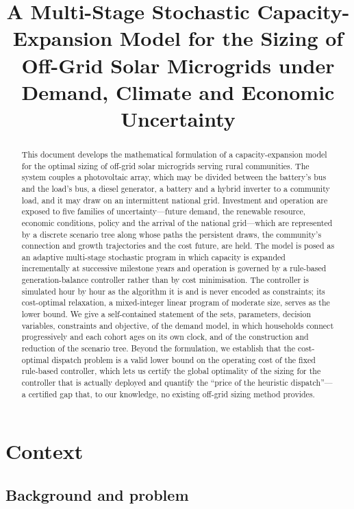 \documentclass[11pt,a4paper]{article}
\title{A Multi-Stage Stochastic Capacity-Expansion Model for the Sizing of
Off-Grid Solar Microgrids under Demand, Climate and Economic Uncertainty}
\author{}
\date{}
\theoremstyle{plain}
\theoremstyle{definition}
\begin{document}
\maketitle

\begin{abstract}
This document develops the mathematical formulation of a capacity-expansion model
for the optimal sizing of off-grid solar microgrids serving rural communities. The
system couples a photovoltaic array, which may be divided between the battery's bus and
the load's bus, a diesel generator, a battery and a hybrid inverter to a community load,
and it may draw on an intermittent national grid. Investment and operation are exposed to
five families of uncertainty---future demand, the renewable resource, economic
conditions, policy and the arrival of the national grid---which are represented by a
discrete scenario tree along whose paths the persistent draws, the community's connection
and growth trajectories and the cost future, are held. The model is posed as an adaptive
multi-stage stochastic program in which capacity is expanded incrementally at successive
milestone years and operation is governed by a rule-based generation-balance controller
rather than by cost minimisation. The controller is simulated hour by hour as the
algorithm it is and is never encoded as constraints; its cost-optimal relaxation, a
mixed-integer linear program of moderate size, serves as the lower bound. We give a
self-contained statement of the sets, parameters, decision variables, constraints and
objective, of the demand model, in which households connect progressively and each cohort
ages on its own clock, and of the construction and reduction of the scenario tree. Beyond
the formulation, we establish that the cost-optimal dispatch problem is a valid lower
bound on the operating cost of the fixed rule-based controller, which lets us certify the
global optimality of the sizing for the controller that is actually deployed and quantify
the ``price of the heuristic dispatch''---a certified gap that, to our knowledge, no
existing off-grid sizing method provides.
\end{abstract}

\tableofcontents

\section{Context}
\label{sec:intro}

\subsection{Background and problem}
\end{document}
